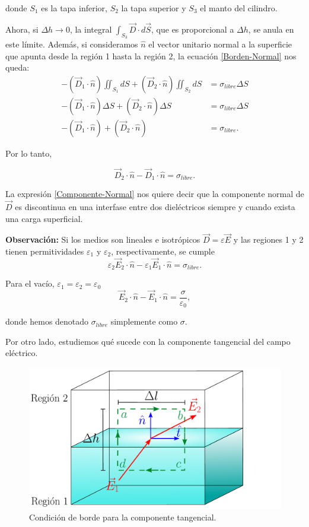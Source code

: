 donde $S_1$ es la tapa inferior, $S_2$ la tapa superior y $S_3$ el manto del cilindro. 

Ahora, si $\Delta h \to 0$, la integral $\int_{S_3} \Vec{D} \cdot d\Vec{S}$, que es proporcional a $\Delta h$, se anula en este límite. Además, si consideramos $\hat{n}$ el vector unitario normal a la superficie que apunta desde la región 1 hasta la región 2, la ecuación \eqref{Borden-Normal} nos queda:
\begin{align*}
    -(\Vec{D}_1 \cdot \hat{n}) \iint_{S_1} dS + (\Vec{D}_2 \cdot \hat{n}) \iint_{S_2} dS &= \sigma_{libre} \Delta S \\
    -(\Vec{D}_1 \cdot \hat{n}) \Delta S + (\Vec{D}_2 \cdot \hat{n}) \Delta S &= \sigma_{libre} \Delta S \\
    -(\Vec{D}_1 \cdot \hat{n}) + (\Vec{D}_2 \cdot \hat{n}) &= \sigma_{libre}.
\end{align*}

Por lo tanto,
\begin{shaded}
\begin{equation}
  \Vec{D}_2 \cdot \hat{n} - \Vec{D}_1 \cdot \hat{n} = \sigma_{libre}.  \label{Componente-Normal}
\end{equation}
\end{shaded}

La expresión \eqref{Componente-Normal} nos quiere decir que la componente normal de $\Vec{D}$ es discontinua en una interfase entre dos dieléctricos siempre y cuando exista una carga superficial.

\textbf{Observación:} Si los medios son lineales e isotrópicos $\Vec{D} = \varepsilon \Vec{E}$ y las regiones 1 y 2 tienen permitividades $\varepsilon_1$ y $\varepsilon_2$, respectivamente, se cumple
$$\varepsilon_2 \Vec{E}_2 \cdot \hat{n} - \varepsilon_1 \Vec{E}_1 \cdot \hat{n} = \sigma_{libre}.$$

Para el vacío, $\varepsilon_1 = \varepsilon_2 = \varepsilon_0$
$$\Vec{E}_2 \cdot \hat{n} - \Vec{E}_1 \cdot \hat{n} = \frac{\sigma}{\varepsilon_0},$$

donde hemos denotado $\sigma_{libre}$ simplemente como $\sigma$.

Por otro lado, estudiemos qué sucede con la componente tangencial del campo eléctrico. 

\begin{figure}[H]
    \centering
    \includegraphics[scale = 0.6]{Figuras/Condicion-Borde-Tangencial.pdf}
    \caption{Condición de borde para la componente tangencial.}
    \label{fig:Borde-Tangencial}
\end{figure}


